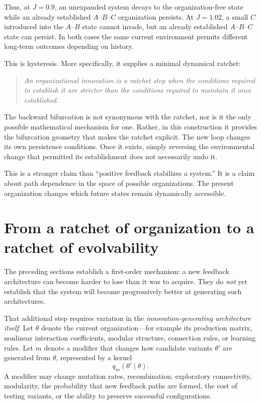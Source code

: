 \documentclass[11pt]{article}
\begin{document}
Thus, at $J=0.9$, an unexpanded system decays to the organization-free state while an already established $A$--$B$--$C$ organization persists. At $J=1.02$, a small $C$ introduced into the $A$--$B$ state cannot invade, but an already established $A$--$B$--$C$ state can persist. In both cases the same current environment permits different long-term outcomes depending on history.

This is hysteresis. More specifically, it supplies a minimal dynamical ratchet:

\begin{quote}
\emph{An organizational innovation is a ratchet step when the conditions required to establish it are stricter than the conditions required to maintain it once established.}
\end{quote}

The backward bifurcation is not synonymous with the ratchet, nor is it the only possible mathematical mechanism for one. Rather, in this construction it provides the bifurcation geometry that makes the ratchet explicit. The new loop changes its own persistence conditions. Once it exists, simply reversing the environmental change that permitted its establishment does not necessarily undo it.

This is a stronger claim than ``positive feedback stabilizes a system.'' It is a claim about path dependence in the space of possible organizations. The present organization changes which future states remain dynamically accessible.

\section{From a ratchet of organization to a ratchet of evolvability}
\label{sec:evolvability}

The preceding sections establish a first-order mechanism: a new feedback architecture can become harder to lose than it was to acquire. They do \emph{not} yet establish that the system will become progressively better at generating such architectures.

That additional step requires variation in the \emph{innovation-generating architecture itself}. Let $\theta$ denote the current organization---for example its production matrix, nonlinear interaction coefficients, modular structure, connection rules, or learning rules. Let $m$ denote a modifier that changes how candidate variants $\theta'$ are generated from $\theta$, represented by a kernel
\[
q_m(\theta'\mid\theta).
\]
A modifier may change mutation rates, recombination, exploratory connectivity, modularity, the probability that new feedback paths are formed, the cost of testing variants, or the ability to preserve successful configurations.
\end{document}
